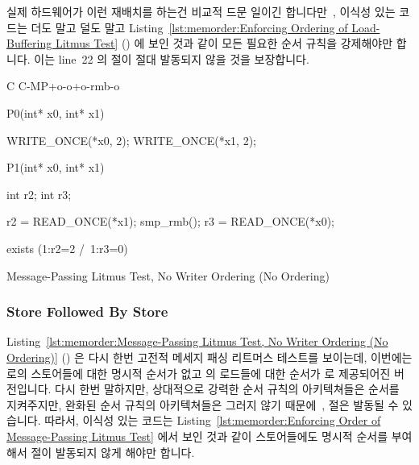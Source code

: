 실제 하드웨어가 이런 재배치를 하는건 비교적 드문
일이긴 합니다만~\cite{LucMaranget2017aarch64},
이식성 있는 코드는 더도 말고 덜도 말고
Listing~\ref{lst:memorder:Enforcing Ordering of Load-Buffering Litmus Test}
()
에 보인 것과 같이 모든 필요한 순서 규칙을 강제해야만 합니다.
이는 line~22 의  절이 절대 발동되지 않을 것을 보장합니다.

\begin{listing}[tbp]
{ \scriptsize
\begin{verbbox}[\LstLineNo]
C C-MP+o-o+o-rmb-o

{
}

P0(int* x0, int* x1) {

  WRITE_ONCE(*x0, 2);
  WRITE_ONCE(*x1, 2);

}

P1(int* x0, int* x1) {

  int r2;
  int r3;

  r2 = READ_ONCE(*x1);
  smp_rmb();
  r3 = READ_ONCE(*x0);

}

exists (1:r2=2 /\ 1:r3=0)
\end{verbbox}
}
\centering
\theverbbox
\caption{Message-Passing Litmus Test, No Writer Ordering (No Ordering)}
\label{lst:memorder:Message-Passing Litmus Test, No Writer Ordering (No Ordering)}
\end{listing}

\subsubsection{Store Followed By Store}
\label{sec:memorder:Store Followed By Store}

Listing~\ref{lst:memorder:Message-Passing Litmus Test, No Writer Ordering (No Ordering)}
()
은 다시 한번 고전적 메세지 패싱 리트머스 테스트를 보이는데, 이번에는 
로의 스토어들에 대한 명시적 순서가 없고  의 로드들에 대한 순서가
 로 제공되어진 버전입니다.
다시 한번 말하지만, 상대적으로 강력한 순서 규칙의 아키텍쳐들은 순서를
지켜주지만, 완화된 순서 규칙의 아키텍쳐들은 그러지 않기
때문에~\cite{JadeAlglave2011ppcmem},  절은 발동될 수 있습니다.
따라서, 이식성 있는 코드는
Listing~\ref{lst:memorder:Enforcing Order of Message-Passing Litmus Test} 에서
보인 것과 같이 스토어들에도 명시적 순서를 부여해서  절이 발동되지
않게 해야만 합니다.
\iffalse

